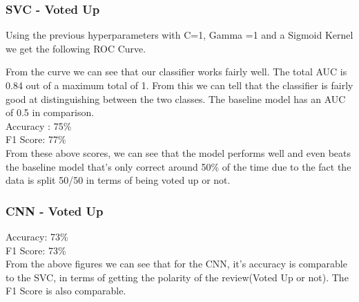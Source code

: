 \documentclass[11pt]{article} %
\begin{document}
\subsubsection{SVC - Voted Up}
Using the previous hyperparameters with C=1, Gamma =1 and a Sigmoid Kernel we get the following ROC Curve.
\begin{figure}[ht]
\centering
{}
\qquad
\end{figure}
From the curve we can see that our classifier works fairly well.  The total AUC is 0.84 out of a maximum total of 1.  From this we can tell that the classifier is fairly good at distinguishing between the two classes.  The baseline model has an AUC of 0.5 in comparison. 
\\Accuracy : 75\%
\\F1 Score: 77\%
\\ From these above scores, we can see that the model performs well and even beats the baseline model that's only correct around 50\% of the time due to the fact the data is split 50/50 in terms of being voted up or not.
\subsubsection{CNN - Voted Up}
Accuracy:  73\%
\\ F1 Score: 73\%
\\ From the above figures we can see that for the CNN, it's accuracy is comparable to the SVC, in terms of getting the polarity of the review(Voted Up or not). The F1 Score is also comparable.
\newpage
\end{document}
